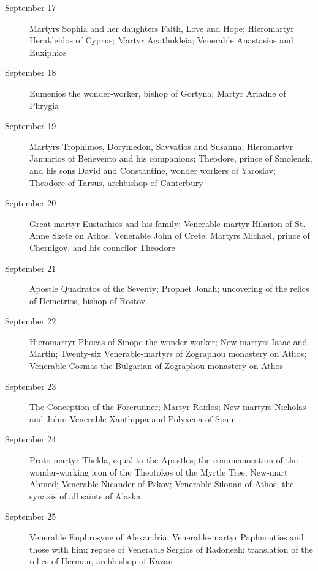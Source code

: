 \begin{description}
\item[September 17]

Martyrs Sophia and her daughters Faith, Love and Hope; Hieromartyr Herakleidos of Cyprus; Martyr Agathokleia; Venerable Anastasios and Euxiphios

\item[September 18]

Eumenios the wonder-worker, bishop of Gortyna; Martyr Ariadne of Phrygia

\item[September 19]

Martyrs Trophimos, Dorymedon, Savvatios and Susanna; Hieromartyr Januarios of Benevento and his companions; Theodore, prince of Smolensk, and his sons David and Constantine, wonder workers of Yaroslav; Theodore of Tarsus, archbishop of Canterbury

\item[September 20]

Great-martyr Eustathios and his family; Venerable-martyr Hilarion of St. Anne Skete on Athos; Venerable John of Crete; Martyrs Michael, prince of Chernigov, and his councilor Theodore

\item[September 21]

Apostle Quadratos of the Seventy; Prophet Jonah; uncovering of the relics of Demetrios, bishop of Rostov

\item[September 22]

Hieromartyr Phocas of Sinope the wonder-worker; New-martyrs Isaac and Martin; Twenty-six Venerable-martyrs of Zographou monastery on Athos; Venerable Cosmas the Bulgarian of Zographou monastery on Athos

\item[September 23]

The Conception of the Forerunner; Martyr Raidos; New-martyrs Nicholas and John; Venerable Xanthippa and Polyxena of Spain

\item[September 24]

Proto-martyr Thekla, equal-to-the-Apostles; the commemoration of the wonder-working icon of the Theotokos of the Myrtle Tree; New-mart Ahmed; Venerable Nicander of Pskov; Venerable Silouan of Athos; the synaxis of all saints of Alaska

\item[September 25]

Venerable Euphrosyne of Alexandria; Venerable-martyr Paphnoutios and those with him; repose of Venerable Sergios of Radonezh; translation of the relics of Herman, archbishop of Kazan


\end{description}
